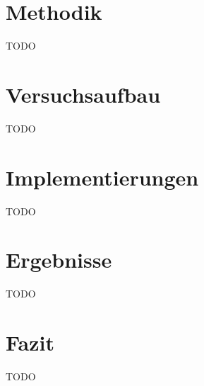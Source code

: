  \label{foundations}

\section{Methodik} \label{sec:performance-methodology}
TODO \\

\section{Versuchsaufbau} \label{sec:performance-testSetup}
TODO \\

\section{Implementierungen} \label{sec:performance-implementations}
TODO \\

\section{Ergebnisse} \label{sec:performance-results}
TODO \\

\section{Fazit} \label{sec:performance-conclusion}
TODO \\